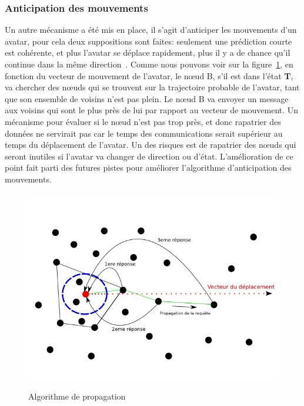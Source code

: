 	\subsubsection{Anticipation des mouvements}
	Un autre mécanisme a été mis en place, il s'agit d'anticiper les mouvements d'un avatar, pour cela deux suppositions sont faites: seulement une prédiction courte est cohérente, et plus l'avatar se déplace rapidement, plus il y a de chance qu'il continue dans la même direction~\cite{191}. Comme nous pouvons voir sur la figure~\ref{Propa_Algo}, en fonction du vecteur de mouvement de l'avatar, le nœud B, s'il est dans l'état \textbf{T}, va chercher des nœuds qui se trouvent sur la trajectoire probable de l'avatar, tant que son ensemble de voisins n'est pas plein. Le nœud B va envoyer un message aux voisins qui sont le plus près de lui par rapport au vecteur de mouvement. Un mécanisme pour évaluer si le nœud n'est pas trop près, et donc rapatrier des données ne servirait pas car le temps des communications serait supérieur au temps du déplacement de l'avatar. Un des risques est de rapatrier des nœuds qui seront inutiles si l'avatar va changer de direction ou d'état. L'amélioration de ce point fait parti des futures pistes pour améliorer l'algorithme d'anticipation des mouvements.\\
	\vspace{5mm}
        \begin{figure}[!h]
        \centering
        \includegraphics[scale=0.5]{./Ressources/Images/propagation_algo.png}\\
        \caption{Algorithme de propagation}
        \label{Propa_Algo}
        \end{figure}
        \vspace{5mm}
